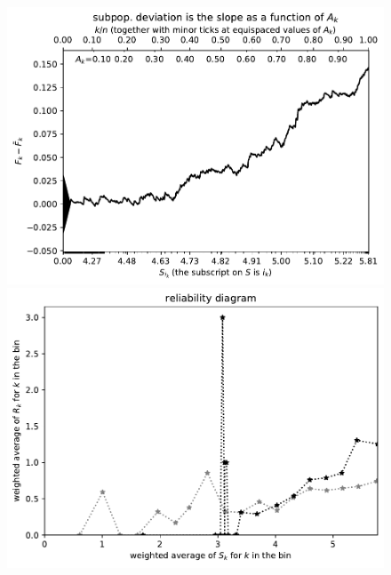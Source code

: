 \documentclass{article}
\begin{document}
\begin{figure}
\begin{centering}

\parbox{\imsize}{\includegraphics[width=\imsize]
{./codes/weighted/County_of_Stanislaus-NRC/cumulative}}
\quad\quad
\parbox{\imsize}{\includegraphics[width=\imsize]
{./codes/weighted/County_of_Stanislaus-NRC/equiscores20}}

\vspace{\vertsep}


\end{centering}
\end{figure}
\end{document}
